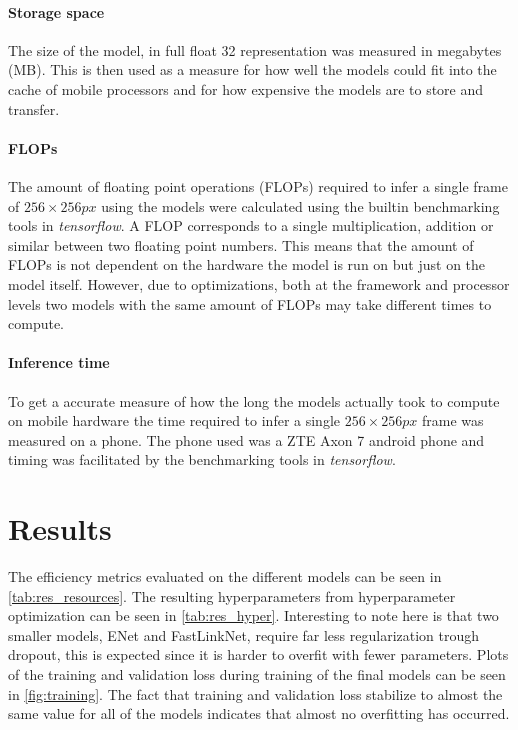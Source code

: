 \documentclass{kththesis}
\begin{document}
\subsubsection{Storage space}
The size of the model, in full float 32 representation was measured in megabytes
(MB). This is then used as a measure for how well the models could fit into the
cache of mobile processors and for how expensive the models are to store and
transfer.

\subsubsection{FLOPs}
The amount of floating point operations (FLOPs) required to infer a single frame
of \(256 \times 256 px\) using the models were calculated using the builtin benchmarking tools in
\textit{tensorflow}. A FLOP corresponds to a single multiplication, addition or
similar between two floating point numbers. This means that the amount of FLOPs is not
dependent on the hardware the model is run on but just on the model itself.
However, due to optimizations, both at the framework and processor levels two
models with the same amount of FLOPs may take different times to compute.

\subsubsection{Inference time}
To get a accurate measure of how the long the models actually took to compute on
mobile hardware the time required to infer a single \(256 \times 256 px\) frame
was measured on a phone. The phone used was a ZTE Axon 7 android phone and
timing was facilitated by the benchmarking tools in \textit{tensorflow}.

\chapter{Results}
The efficiency metrics evaluated on the different models can be seen in \cref{tab:res_resources}.
The resulting hyperparameters from hyperparameter optimization can be seen in
\cref{tab:res_hyper}. Interesting to note here is that two smaller models, ENet
and FastLinkNet, require far less regularization trough dropout, this is
expected since it is harder to overfit with fewer parameters.
Plots of the training and validation loss during training of the final models
can be seen in \cref{fig:training}. The fact that training and validation
loss stabilize to almost the same value for all of the models indicates that
almost no overfitting has occurred.
\end{document}
